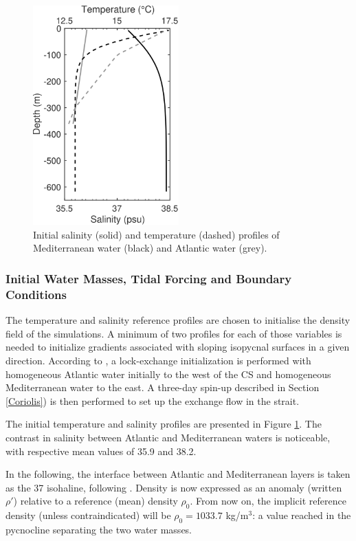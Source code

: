 \begin{figure}[!t]
 \centering
 \includegraphics[width=0.5\textwidth]{./GBR2D/figure3.png}
 \caption{Initial salinity (solid) and temperature (dashed) profiles of Mediterranean water (black) and Atlantic water (grey).}
\label{fig_LEx}
\end{figure}


\subsubsection{Initial Water Masses, Tidal Forcing and Boundary Conditions}
\label{init}
\indent The temperature and salinity reference profiles are chosen to initialise the density field of the simulations. A minimum of two profiles for each of those variables is needed to initialize gradients associated with sloping isopycnal surfaces in a given direction. According to \citet{Sannino2002}, a lock-exchange initialization is performed with homogeneous Atlantic water initially to the west of the CS and homogeneous Mediterranean water to the east. A three-day spin-up described in Section \ref{Coriolis}) is then performed to set up the exchange flow in the strait.

The initial temperature and salinity profiles are presented in Figure \ref{fig_LEx}. The contrast in salinity between Atlantic and Mediterranean waters is noticeable, with respective mean values of 35.9 and 38.2. 

In the following, the interface between Atlantic and Mediterranean layers is taken as the 37 isohaline, following \citet{Bryden94}. Density is now expressed as an anomaly (written $\rho'$) relative to a reference (mean) density $\rho_{0}$. From now on, the implicit reference density (unless contraindicated) will be $\rho_{0}=1033.7$ kg/m$^3$: a value reached in the pycnocline separating the two water masses.

